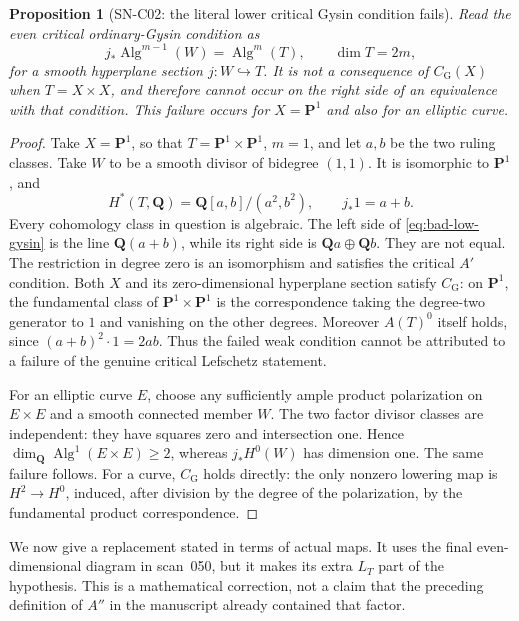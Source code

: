 \documentclass[11pt,a4paper]{article}
\newtheorem{proposition}[theorem]{Proposition}
\theoremstyle{definition}
\theoremstyle{remark}
\begin{document}
\begin{proposition}[SN-C02: the literal lower critical Gysin condition fails]
\label{prop:literal-critical-fails}
Read the even critical ordinary-Gysin condition as
\begin{equation}
 j_*\operatorname{Alg}^{m-1}(W)=\operatorname{Alg}^{m}(T),
 \qquad \dim T=2m,
 \label{eq:bad-low-gysin}
\end{equation}
for a smooth hyperplane section $j:W\hookrightarrow T$.
It is not a consequence of $C_{\mathrm G}(X)$ when $T=X\times X$,
and therefore cannot occur on the right side of an equivalence with
that condition.  This failure occurs for $X=\mathbf P^1$ and also
for an elliptic curve.
\end{proposition}
\begin{proof}
Take $X=\mathbf P^1$, so that $T=\mathbf P^1\times\mathbf P^1$,
$m=1$, and let $a,b$ be the two ruling classes.  Take $W$ to be a
smooth divisor of bidegree $(1,1)$.  It is isomorphic to
$\mathbf P^1$, and
\[
 H^*(T,\mathbf Q)=\mathbf Q[a,b]/(a^2,b^2),\qquad
 j_*1=a+b.
\]
Every cohomology class in question is algebraic.  The left side of
\eqref{eq:bad-low-gysin} is the line $\mathbf Q(a+b)$, while its
right side is $\mathbf Qa\oplus\mathbf Qb$.  They are not equal.
The restriction in degree zero is an isomorphism and satisfies the
critical $A'$ condition.  Both $X$ and its zero-dimensional hyperplane
section satisfy $C_{\mathrm G}$: on $\mathbf P^1$, the fundamental
class of $\mathbf P^1\times\mathbf P^1$ is the correspondence taking
the degree-two generator to $1$ and vanishing on the other degrees.
Moreover $A(T)^0$ itself holds, since
$(a+b)^2\cdot1=2ab$.  Thus the failed weak condition cannot be
attributed to a failure of the genuine critical Lefschetz statement.

For an elliptic curve $E$, choose any sufficiently ample product
polarization on $E\times E$ and a smooth connected member $W$.
The two factor divisor classes are independent: they have squares
zero and intersection one.  Hence
$\dim_{\mathbf Q}\operatorname{Alg}^1(E\times E)\ge2$, whereas
$j_*H^0(W)$ has dimension one.  The same failure follows.  For a
curve, $C_{\mathrm G}$ holds directly: the only nonzero lowering
map is $H^2\to H^0$, induced, after division by the degree of the
polarization, by the fundamental product correspondence.
\end{proof}

We now give a replacement stated in terms of actual maps.  It uses
the final even-dimensional diagram in scan~050, but it makes its
extra $L_T$ part of the hypothesis.  This is a mathematical correction,
not a claim that the preceding definition of $A''$ in the manuscript
already contained that factor.
\end{document}
